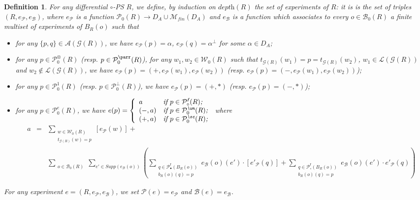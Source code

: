 \documentclass{article}
\newcommand{\target}[1]{t_{#1}}
\theoremstyle{plain}
\newtheorem{definition}{Definition}
\newcommand{\leftwires}[1]{\mathcal{L}(#1)}
\newcommand{\groundof}[1]{\mathcal{G}(#1)}
\newcommand{\finitemultisets}[1]{\mathcal{M}_\textit{fin}(#1)}
\newcommand{\tens}{\otimes}
\newcommand{\one}{1}
\newcommand{\cod}{\oc}
\newcommand{\contr}{\wn}
\newcommand{\portsatzero}[1]{\mathcal{P}_0(#1)}
\newcommand{\wiresatzero}[1]{\mathcal{W}_0(#1)}
\newcommand{\ports}[1]{\mathcal{P}(#1)}
\newcommand{\axioms}[1]{\mathcal{A}(#1)}
\newcommand{\portsatzerooftype}[2]{\mathcal{P}_0^{#1}(#2)}
\newcommand{\exponentialportsatzero}[1]{\mathcal{P}_0^\textit{e}(#1)}
\newcommand{\conclusionscirc}[1]{\mathcal{P}_\circ^{\textsf{f}}(#1)}
\newcommand{\conclusionsnotcirc}[1]{\mathcal{P}_\bullet^{\textsf{f}}(#1)}
\newcommand{\boxes}[1]{\mathcal{B}(#1)}
\newcommand{\boxesatzero}[1]{\mathcal{B}_{0}(#1)}
\newcommand{\supp}[1]{\textit{Supp}(#1)}
\begin{document}
\begin{definition}\label{defin: experiment in an untyped framework}
For any differential $\circ$-PS $R$, we define, by induction on $\textit{depth}(R)$ the set of \emph{experiments of $R$}: it is is the set of triples $(R, e_\mathcal{P}, e_\mathcal{B})$, where $e_\mathcal{P}$ is a function $\portsatzero{R} \to D_A \cup \finitemultisets{D_A}$ and $e_\mathcal{B}$ is a function which associates to every $o \in \boxesatzero{R}$ a finite multiset of experiments of $B_R(o)$ such that
\begin{itemize}
\item for any $\{ p, q \} \in \axioms{\groundof{R}}$, we have $e_\mathcal{P}(p) = \alpha$, $e_\mathcal{P}(q)  = \alpha^\perp$ for some $\alpha \in D_A$;
\item for any $p \in \portsatzerooftype{\tens}{R}$ (resp. $p \in \portsatzerooftype{\parr}{R}$), for any $w_1, w_2 \in \wiresatzero{R}$ such that $\target{\groundof{R}}(w_1) = p = \target{\groundof{R}}(w_2)$, $w_1 \in \leftwires{\groundof{R}}$ and $w_2 \notin \leftwires{\groundof{R}}$, we have $e_\mathcal{P}(p) = (+, e_\mathcal{P}(w_1), e_\mathcal{P}(w_2))$ (resp. $e_\mathcal{P}(p) = (-, e_\mathcal{P}(w_1), e_\mathcal{P}(w_2))$);
\item for any $p \in \portsatzerooftype{\one}{R}$ (resp. $p \in \portsatzerooftype{\bot}{R}$), we have $e_\mathcal{P}(p) = (+, \ast)$ (resp. $e_\mathcal{P}(p) = (-, \ast)$);
\item for any $p \in \exponentialportsatzero{R}$,
we have $e(p) = \left\lbrace \begin{array}{ll} 
a & \textit{if $p \in \conclusionscirc{R}$;}\\
(-, a) & \textit{if $p \in \portsatzerooftype{\contr}{R}$;}\\
(+, a) & \textit{if $p \in \portsatzerooftype{\cod}{R}$;}
\end{array} \right.$
where 
\begin{eqnarray*}
a & = & \sum_{\begin{array}{c} w \in \wiresatzero{R}\\ \target{\groundof{R}}(w) = p \end{array}} [e_\mathcal{P}(w)] +\\ 
&  & \sum_{\begin{array}{c} o \in \boxesatzero{R} \end{array}} \sum_{e' \in \supp{e_\mathcal{B}(o)}}  ( \sum_{\begin{array}{c} q \in \conclusionsnotcirc{B_R(o)}\\ b_R(o)(q) = p \end{array}} e_\mathcal{B}(o)(e') \cdot [{e'}_\mathcal{P}(q)] + \sum_{\begin{array}{c} q \in \conclusionscirc{B_R(o)}\\ b_R(o)(q) = p \end{array}} e_\mathcal{B}(o)(e') \cdot {e'}_\mathcal{P}(q) ) 
\end{eqnarray*}
\end{itemize}
For any experiment $e = (R, e_\mathcal{P}, e_\mathcal{B})$, we set $\ports{e} = e_\mathcal{P}$ and $\boxes{e} = e_\mathcal{B}$.


\end{definition}
\end{document}
